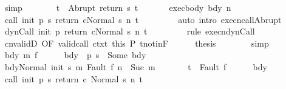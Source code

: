 \begin{isabellebody}
\ simp\isanewline
\ \ \ \ \isamarkupfalse%
\ \isamarkupfalse%
\ {\isachardoublequoteopen}t\ {\isacharequal}\ Abrupt\ {\isacharparenleft}return{\isacharprime}\ s\ t{\isacharprime}{\isacharparenright}{\isachardoublequoteclose}\ \isacommand{{\isachardot}}\isamarkupfalse%
\isanewline
\ \ \ \ \isamarkupfalse%
\ exec{\isacharunderscore}body\ bdy\ n\isanewline
\ \ \ \ \isamarkupfalse%
\ {\isachardoublequoteopen}{\isasymGamma}{\isasymturnstile}{\isasymlangle}call\ init\ {\isacharparenleft}p\ s{\isacharparenright}\ return{\isacharprime}\ c{\isacharcomma}Normal\ s{\isasymrangle}\ {\isacharequal}n{\isasymRightarrow}\ t{\isachardoublequoteclose}\ \isanewline
\ \ \ \ \ \ \isamarkupfalse%
\ {\isacharparenleft}auto\ intro{\isacharcolon}\ execn{\isacharunderscore}callAbrupt{\isacharparenright}\isanewline
\ \ \ \ \isamarkupfalse%
\ {\isachardoublequoteopen}{\isasymGamma}{\isasymturnstile}{\isasymlangle}dynCall\ init\ p\ return{\isacharprime}\ c{\isacharcomma}Normal\ s{\isasymrangle}\ {\isacharequal}n{\isasymRightarrow}\ t{\isachardoublequoteclose}\ \isanewline
\ \ \ \ \ \ \isamarkupfalse%
\ {\isacharparenleft}rule\ execn{\isacharunderscore}dynCall{\isacharparenright}\isanewline
\ \ \ \ \isamarkupfalse%
\ cnvalidD\ {\isacharbrackleft}OF\ valid{\isacharunderscore}call\ ctxt\ this{\isacharbrackright}\ P\ t{\isacharunderscore}notin{\isacharunderscore}F\isanewline
\ \ \ \ \isamarkupfalse%
\ {\isacharquery}thesis\isanewline
\ \ \ \ \ \ \isamarkupfalse%
\ simp\isanewline
\ \ \isamarkupfalse%
\isanewline
\ \ \ \ \isamarkupfalse%
\ bdy\ m\ f\isanewline
\ \ \ \ \isamarkupfalse%
\ bdy{\isacharcolon}\ {\isachardoublequoteopen}{\isasymGamma}\ {\isacharparenleft}p\ s{\isacharparenright}\ {\isacharequal}\ Some\ bdy{\isachardoublequoteclose}\isanewline
\ \ \ \ \isamarkupfalse%
\ {\isachardoublequoteopen}{\isasymGamma}{\isasymturnstile}{\isasymlangle}bdy{\isacharcomma}Normal\ {\isacharparenleft}init\ s{\isacharparenright}{\isasymrangle}\ {\isacharequal}m{\isasymRightarrow}\ Fault\ f{\isachardoublequoteclose}\ {\isachardoublequoteopen}n\ {\isacharequal}\ Suc\ m{\isachardoublequoteclose}\ \isanewline
\ \ \ \ \ \ {\isachardoublequoteopen}t\ {\isacharequal}\ Fault\ f{\isachardoublequoteclose}\isanewline
\ \ \ \ \isamarkupfalse%
\ bdy\ \isamarkupfalse%
\ {\isachardoublequoteopen}{\isasymGamma}{\isasymturnstile}{\isasymlangle}call\ init\ {\isacharparenleft}p\ s{\isacharparenright}\ return{\isacharprime}\ c\ {\isacharcomma}Normal\ s{\isasymrangle}\ {\isacharequal}n{\isasymRightarrow}\ t{\isachardoublequoteclose}\isanewline

\end{isabellebody}
